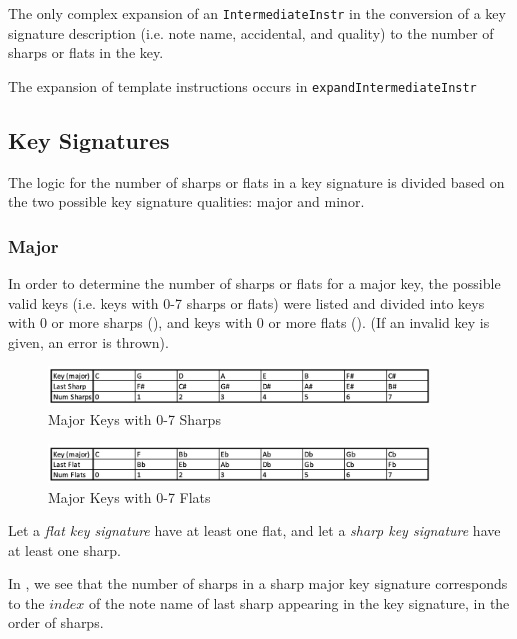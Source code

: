 \documentclass{report}
\begin{document}
The only complex expansion of an \verb.IntermediateInstr. in the conversion of a key signature description (i.e. note name, accidental, and quality) to the number of sharps or flats in the key.

The expansion of template instructions occurs in \verb.expandIntermediateInstr.
\subsection{Key Signatures}
The logic for the number of sharps or flats in a key signature is divided based on the two possible key signature qualities: major and minor. 
\subsubsection{Major}

In order to determine the number of sharps or flats for a major key, the possible valid keys (i.e. keys with 0-7 sharps or flats) were listed and divided into keys with 0 or more sharps (), and keys with 0 or more flats (). (If an invalid key is given, an error is thrown).

\begin{figure}[h!]
\centering
\includegraphics[width=0.9\textwidth]{images/major_sharp}
\caption{Major Keys with 0-7 Sharps}
\label{major_sharp_keys}
\end{figure}

\begin{figure}[h!]
\centering
\includegraphics[width=0.9\textwidth]{images/major_flat}
\caption{Major Keys with 0-7 Flats}
\label{major_flat_keys}
\end{figure}

\newpage

Let a \textit{flat key signature} have at least one flat, and let a \textit{sharp key signature} have at least one sharp.

In , we see that the number of sharps in a sharp major key signature corresponds to the $index$ of the note name of last sharp appearing in the key signature, in the order of sharps. 
\end{document}
